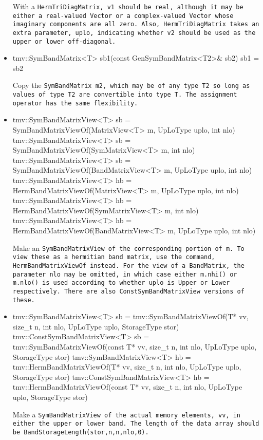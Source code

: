 \begin{itemize}
With a \tt{HermTriDiagMatrix}, \tt{v1} should be real, although
it may be either a real-valued \tt{Vector} or a complex-valued
\tt{Vector} whose imaginary components are all zero.
Also, \tt{HermTriDiagMatrix} takes an extra parameter, \tt{uplo}, indicating
whether \tt{v2} should be used as the upper or lower off-diagonal.

\item
\begin{tmvcode}
tmv::SymBandMatrix<T> sb1(const GenSymBandMatrix<T2>& sb2)
sb1 = sb2
\end{tmvcode}
Copy the \tt{SymBandMatrix m2}, which may be of any type \tt{T2} so long
as values of type \tt{T2} are convertible into type \tt{T}.
The assignment operator has the same flexibility.

\item
\begin{tmvcode}
tmv::SymBandMatrixView<T> sb = 
      SymBandMatrixViewOf(MatrixView<T> m, UpLoType uplo, int nlo)
tmv::SymBandMatrixView<T> sb = 
      SymBandMatrixViewOf(SymMatrixView<T> m, int nlo)
tmv::SymBandMatrixView<T> sb = 
      SymBandMatrixViewOf(BandMatrixView<T> m, UpLoType uplo, int nlo)
tmv::SymBandMatrixView<T> hb = 
      HermBandMatrixViewOf(MatrixView<T> m, UpLoType uplo, int nlo)
tmv::SymBandMatrixView<T> hb = 
      HermBandMatrixViewOf(SymMatrixView<T> m, int nlo)
tmv::SymBandMatrixView<T> hb = 
      HermBandMatrixViewOf(BandMatrixView<T> m, UpLoType uplo, int nlo)
\end{tmvcode}
Make an \tt{SymBandMatrixView} of the corresponding portion of \tt{m}.  
To view these as a hermitian band matrix, use the command,
\tt{HermBandMatrixViewOf} instead.
For the view of a \tt{BandMatrix}, the parameter \tt{nlo} may be 
omitted, in which case either \tt{m.nhi()} or \tt{m.nlo()} is used 
according to whether \tt{uplo} is \tt{Upper} or \tt{Lower} respectively.
There are also \tt{ConstSymBandMatrixView} versions of these.

\item
\begin{tmvcode}
tmv::SymBandMatrixView<T> sb = 
      tmv::SymBandMatrixViewOf(T* vv, size_t n, int nlo, 
          UpLoType uplo, StorageType stor)
tmv::ConstSymBandMatrixView<T> sb = 
      tmv::SymBandMatrixViewOf(const T* vv, size_t n, int nlo, 
          UpLoType uplo, StorageType stor)
tmv::SymBandMatrixView<T> hb = 
      tmv::HermBandMatrixViewOf(T* vv, size_t n, int nlo, 
          UpLoType uplo, StorageType stor)
tmv::ConstSymBandMatrixView<T> hb = 
      tmv::HermBandMatrixViewOf(const T* vv, size_t n, int nlo, 
          UpLoType uplo, StorageType stor)
\end{tmvcode}
Make a \tt{SymBandMatrixView} of the actual memory elements, \tt{vv}, in either the
upper or lower band.  The length of the data array should be 
\tt{BandStorageLength(stor,n,n,nlo,0)}.


\end{itemize}
